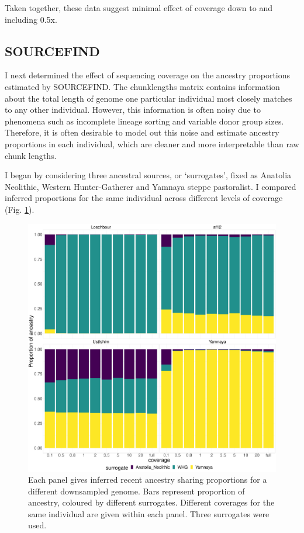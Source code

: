 Taken together, these data suggest minimal effect of coverage down to and including 0.5x.

\subsection{SOURCEFIND}

I next determined the effect of sequencing coverage on the ancestry proportions estimated by SOURCEFIND. The chunklengths matrix contains information about the total length of genome one particular individual most closely matches to any other individual. However, this information is often noisy due to phenomena such as incomplete lineage sorting and variable donor group sizes. Therefore, it is often desirable to model out this noise and estimate ancestry proportions in each individual, which are cleaner and more interpretable than raw chunk lengths. 

I began by considering three ancestral sources, or `surrogates', fixed as Anatolia Neolithic, Western Hunter-Gatherer and Yamnaya steppe pastoralist. I compared inferred proportions for the same individual across different levels of coverage (Fig. \ref{fig:3pop_SF_downsampled}). 

\begin{figure}[htp]
    \centering
    \includegraphics[width=1.0\textwidth]{../images/chapter1/3pop_SF_downsampled.pdf}
    \caption{Each panel gives inferred recent ancestry sharing proportions for a different downsampled genome. Bars represent proportion of ancestry, coloured by different surrogates. Different coverages for the same individual are given within each panel. Three surrogates were used.}
    \label{fig:3pop_SF_downsampled}
\end{figure}

